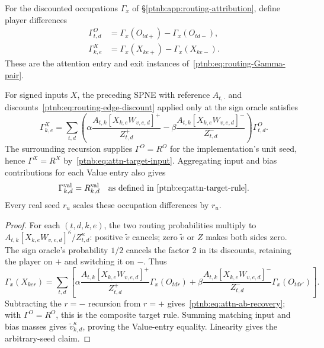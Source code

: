 For the discounted occupations $\Gamma_x$ of \S\ref{ptnb:app:routing-attribution}, define player differences
\begin{align}
    \Gamma^O_{t,d}&=\Gamma_x(O_{td+})-\Gamma_x(O_{td-}),\label{ptnb:eq:attn-Gamma-O}\\
    \Gamma^X_{k,e}&=\Gamma_x(X_{ke+})-\Gamma_x(X_{ke-}).\label{ptnb:eq:attn-Gamma-X}
\end{align}
These are the attention entry and exit instances of~\eqref{ptnb:eq:routing-Gamma-pair}.

\begin{theoremenv}\label{ptnb:thm:attn-ab-recovery}\label{thm:attention_ab_recovery}\label{ptnb:thm:attention}
For signed inputs $X$, the preceding SPNE with reference $A_{t,\cdot}$ and discounts~\eqref{ptnb:eq:routing-edge-discount} applied only at the sign oracle satisfies
\begin{equation}\label{ptnb:eq:attn-ab-recovery}
    \Gamma^X_{k,e}=\sum_{t,d}\left(
       \alpha\frac{A_{t,k}[X_{k,e}W_{v,e,d}]^+}{Z_{t,d}^+}
       -\beta\frac{A_{t,k}[X_{k,e}W_{v,e,d}]^-}{Z_{t,d}^-}
       \right)\Gamma^O_{t,d}.
\end{equation}
The surrounding recursion supplies $\Gamma^O=R^O$ for the implementation's unit seed, hence $\Gamma^X=R^X$ by~\eqref{ptnb:eq:attn-target-input}. Aggregating input and bias contributions for each Value entry also gives
\begin{equation}\label{ptnb:eq:attn-Gamma-V-corollary}
    \Gamma^{\mathrm{val}}_{k,d}=R^{\mathrm{val}}_{k,d}
    \quad\text{as defined in~\eqref{ptnb:eq:attn-target-rule}}.
\end{equation}
Every real seed $r_u$ scales these occupation differences by $r_u$.
\end{theoremenv}
\begin{proof}
For each $(t,d,k,e)$, the two routing probabilities multiply to $A_{t,k}[X_{k,e}W_{v,e,d}]^\kappa/Z_{t,d}^\kappa$: positive $\tilde v$ cancels; zero $\tilde v$ or $Z$ makes both sides zero. The sign oracle's probability $1/2$ cancels the factor $2$ in its discounts, retaining the player on $+$ and switching it on $-$. Thus
\begin{equation}\label{ptnb:eq:attn-Gamma-X-recursion}
    \Gamma_x(X_{ker})=\sum_{t,d}\left[
      \alpha\frac{A_{t,k}[X_{k,e}W_{v,e,d}]^+}{Z_{t,d}^+}\Gamma_x(O_{tdr})
      +\beta\frac{A_{t,k}[X_{k,e}W_{v,e,d}]^-}{Z_{t,d}^-}\Gamma_x(O_{tdr'})
    \right].
\end{equation}
Subtracting the $r=-$ recursion from $r=+$ gives~\eqref{ptnb:eq:attn-ab-recovery}; with $\Gamma^O=R^O$, this is the composite target rule. Summing matching input and bias masses gives $\tilde v_{k,d}^\kappa$, proving the Value-entry equality. Linearity gives the arbitrary-seed claim.
\end{proof}

